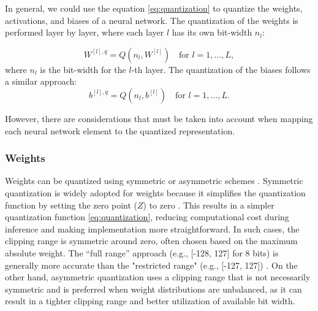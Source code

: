 In general, we could use the equation \ref{eq:quantization} to quantize the weights, activations, and biases of a neural network. The quantization of the weights is performed layer by layer, where each layer $l$ has its own bit-width $n_l$:

\begin{equation}
W^{[l],q} = Q(n_l, W^{[l]}) \quad \text{for } l = 1, \dots, L,
\end{equation}
where $n_l$ is the bit-width for the $l$-th layer. The quantization of the biases follows a similar approach:
\begin{equation}
b^{[l],q} = Q(n_l, b^{[l]}) \quad \text{for } l = 1, \dots, L.
\end{equation}

However, there are considerations that must be taken into account when mapping each neural network element to the quantized representation. 

\subsubsection*{Weights}

Weights can be quantized using symmetric or asymmetric schemes \cite{gholami2021surveyquantizationmethodsefficient}. Symmetric quantization is widely adopted for weights because it simplifies the quantization function by setting the zero point ($Z$) to zero \cite{gholami2021surveyquantizationmethodsefficient}. This results in a simpler quantization function \ref{eq:quantization}, reducing computational cost during inference and making implementation more straightforward. In such cases, the clipping range is symmetric around zero, often chosen based on the maximum absolute weight. The ``full range'' approach (e.g., [-128, 127] for 8 bits) is generally more accurate than the "restricted range" (e.g., [-127, 127]) \cite{gholami2021surveyquantizationmethodsefficient}. On the other hand, asymmetric quantization uses a clipping range that is not necessarily symmetric and is preferred when weight distributions are unbalanced, as it can result in a tighter clipping range and better utilization of available bit width.

